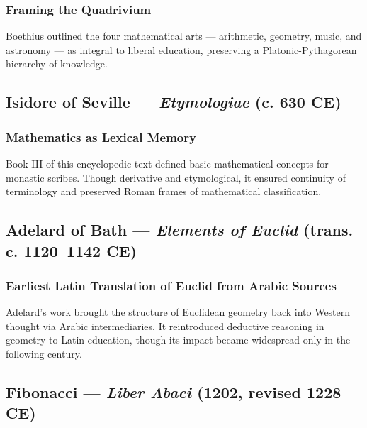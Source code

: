 \documentclass[9pt]{article}
\begin{document}
\subsubsection*{Framing the Quadrivium}

Boethius outlined the four mathematical arts — arithmetic, geometry, music, and astronomy — as integral to liberal education, preserving a Platonic-Pythagorean hierarchy of knowledge.

\vspace{0.5em}

\subsection*{Isidore of Seville — \textit{Etymologiae} (c. 630 CE)}

\subsubsection*{Mathematics as Lexical Memory}

Book III of this encyclopedic text defined basic mathematical concepts for monastic scribes.  
Though derivative and etymological, it ensured continuity of terminology and preserved Roman frames of mathematical classification.

\vspace{0.5em}

\subsection*{Adelard of Bath — \textit{Elements of Euclid} (trans. c. 1120–1142 CE)}

\subsubsection*{Earliest Latin Translation of Euclid from Arabic Sources}

Adelard’s work brought the structure of Euclidean geometry back into Western thought via Arabic intermediaries.  
It reintroduced deductive reasoning in geometry to Latin education, though its impact became widespread only in the following century.

\vspace{0.5em}

\subsection*{Fibonacci — \textit{Liber Abaci} (1202, revised 1228 CE)}
\end{document}
